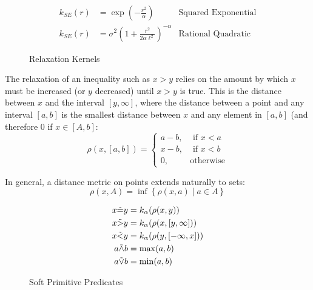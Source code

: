 \begin{figure}\label{kernels}
\begin{align*}
k_{SE}(r) &= \exp\left(-\frac{r^2}{\alpha}\right) & \text{Squared Exponential}\\
k_{SE}(r) &= \sigma^2\left(1 + \frac{r^2}{2 \alpha \ell^2}\right)^{-\alpha} & \text{Rational Quadratic}
\end{align*}
\caption{Relaxation Kernels}
\end{figure}

The relaxation of an inequality such as $x > y$ relies on the amount by which $x$ must be increased (or $y$ decreased) until $x > y$ is true.
This is the distance between $x$ and the interval $[y, \infty]$, where the distance between a point and any interval $[a, b]$ is the smallest distance between $x$ and any element in $[a, b]$ (and therefore 0 if $x \in [A, b]$:
\begin{equation}
\rho(x, [a, b]) =
\begin{cases}
  a - b, & \text{ if } x < a\\
  x - b, & \text{ if } x < b\\
  0,              & \text{otherwise}
\end{cases}
\end{equation}

In general, a distance metric on points extends naturally to sets:
\[
\rho(x, A) = \inf \left\{\rho(x, a) \mid a \in A\right\}
\]




\begin{figure}\label{softpreds}
  \begin{align*}
x \tilde{=} y &= k_\alpha(\rho(x, y))\\
x \tilde{>} y &= k_\alpha(\rho(x, [y, \infty]))\\
x \tilde{<} y &= k_\alpha(\rho(y, [-\infty, x]))\\
a \tilde{\land} b &= \max(a, b)\\
a \tilde{\lor} b &= \min(a, b)
  \end{align*}
\caption{Soft Primitive Predicates}
\end{figure}

